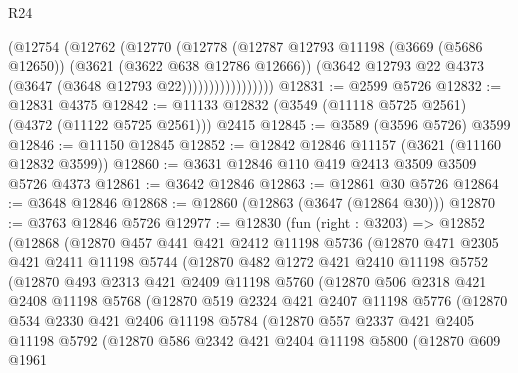 \begin{lexlean}{R24}
\begin{coremodule}
                      (@12754
                        (@12762
                          (@12770
                            (@12778
                              (@12787
                                @12793
                                @11198
                                (@3669 (@5686 @12650))
                                (@3621 (@3622 @638 @12786 @12666))
                                (@3642 @12793 @22 @4373 (@3647 (@3648 @12793 @22)))))))))))))))))
@12831 := @2599 @5726
@12832 := @12831 @4375
@12842 := @11133 @12832 (@3549 (@11118 @5725 @2561) (@4372 (@11122 @5725 @2561))) @2415
@12845 := @3589 (@3596 @5726) @3599
@12846 := @11150 @12845
@12852 := @12842 @12846 @11157 (@3621 (@11160 @12832 @3599))
@12860 := @3631 @12846 @110 @419 @2413 @3509 @3509 @5726 @4373
@12861 := @3642 @12846
@12863 := @12861 @30 @5726
@12864 := @3648 @12846
@12868 := @12860 (@12863 (@3647 (@12864 @30)))
@12870 := @3763 @12846 @5726
@12977 := @12830
    (fun (right : @3203) =>
    @12852
      (@12868
        (@12870
          @457
          @441
          @421
          @2412
          @11198
          @5736
          (@12870
            @471
            @2305
            @421
            @2411
            @11198
            @5744
            (@12870
              @482
              @1272
              @421
              @2410
              @11198
              @5752
              (@12870
                @493
                @2313
                @421
                @2409
                @11198
                @5760
                (@12870
                  @506
                  @2318
                  @421
                  @2408
                  @11198
                  @5768
                  (@12870
                    @519
                    @2324
                    @421
                    @2407
                    @11198
                    @5776
                    (@12870
                      @534
                      @2330
                      @421
                      @2406
                      @11198
                      @5784
                      (@12870
                        @557
                        @2337
                        @421
                        @2405
                        @11198
                        @5792
                        (@12870
                          @586
                          @2342
                          @421
                          @2404
                          @11198
                          @5800
                          (@12870
                            @609
                            @1961

\end{coremodule}
\end{lexlean}
